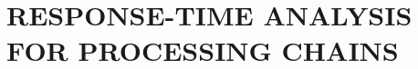 
\section{RESPONSE-TIME ANALYSIS FOR PROCESSING CHAINS}
\label{sec: response-time analysis for processing chains}



